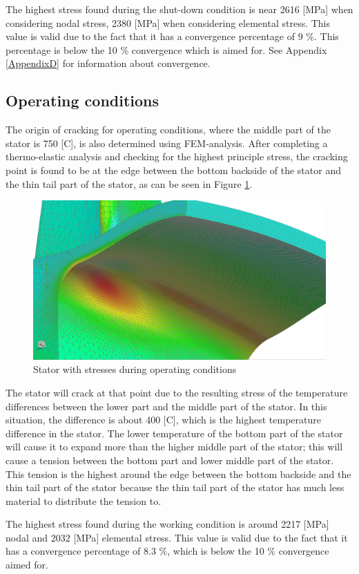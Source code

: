The highest stress found during the shut-down condition is near 2616 [MPa] when considering nodal stress, 2380 [MPa] when considering elemental stress. This value is valid due to the fact that it has a convergence percentage of 9 \%. This percentage is below the 10 \% convergence which is aimed for. See Appendix \ref{AppendixD} for  information about convergence.

\subsection{Operating conditions}
The origin of cracking for operating conditions, where the middle part of the stator is 750 [\textdegree C], is also determined using FEM-analysis. After completing a thermo-elastic analysis and checking for the highest principle stress, the cracking point is found to be at the edge between the bottom backside of the stator and the thin tail part of the stator, as can be seen in Figure \ref{stator2}. 

\begin{figure} [H]
 	\centering
 	\includegraphics[width=0.8\linewidth]{Figures/0_075OriginalOperating.PNG}
 	\caption{Stator with stresses during operating conditions}
    \label{stator2}
 \end{figure}

The stator will crack at that point due to the resulting stress of the temperature differences between the lower part and the middle part of the stator. In this situation, the difference is about 400 [\textdegree C], which is the highest temperature difference in the stator. The lower temperature of the bottom part of the stator will cause it to expand more than the higher middle part of the stator; this will cause a tension between the bottom part and lower middle part of the stator. This tension is the highest around the edge between the bottom backside and the thin tail part of the stator because the thin tail part of the stator has much less material to distribute the tension to.

The highest stress found during the working condition is around 2217 [MPa] nodal and 2032 [MPa] elemental stress. This value is valid due to the fact that it has a convergence percentage of 8.3 \%, which is below the 10 \% convergence aimed for.
\newpage